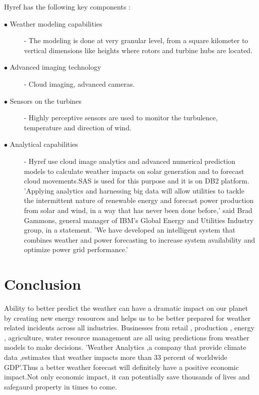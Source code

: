 \documentclass[sigconf]{acmart}
\begin{document}
Hyref has the following key components :\\

\begin{description}

\item [$\bullet$ Weather modeling capabilities] - The modeling is done at very granular level, from a square kilometer to vertical dimensions like heights where rotors and turbine hubs are located.

\item [$\bullet$ Advanced imaging technology] - Cloud imaging, advanced cameras.

\item [$\bullet$ Sensors on the turbines] - Highly perceptive sensors are used to monitor the turbulence, temperature and direction of wind.

\item [$\bullet$ Analytical capabilities] - Hyref use cloud image analytics and advanced numerical prediction models to calculate weather impacts on solar generation and to forecast cloud movements.SAS is used for this purpose and it is on DB2 platform.\cite{Hyref04}\\


'Applying analytics and harnessing big data will allow utilities to tackle the intermittent nature of renewable energy and forecast power production from solar and wind, in a way that has never been done before,' said Brad Gammons, general manager of IBM's Global Energy and Utilities Industry group, in a statement. 'We have developed an intelligent system that combines weather and power forecasting to increase system availability and optimize power grid performance.'\cite{Hyref03}

\end{description}


\section{Conclusion}


Ability to better predict the weather can have a dramatic impact on our planet by creating new energy resources and helps us to be better prepared for weather related incidents across all industries. Businesses from retail , production , energy , agriculture, water resource management are all using predictions from weather models to make decisions. 'Weather Analytics ,a company that provide climate data ,estimates that weather impacts more than 33 percent of worldwide GDP'.\cite{Coclus01}Thus a better weather forecast will definitely have a positive economic impact.Not only economic impact, it can potentially save thousands of lives and safegaurd property in times to come.\\
\end{document}
